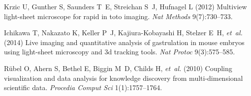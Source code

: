 \documentclass{pnastwo}
\begin{document}
\begin{article}
\begin{thebibliography}{10}
Krzic U, Gunther S, Saunders T~E, Streichan S~J, Hufnagel L (2012) Multiview
  light-sheet microscope for rapid in toto imaging. \textit{Nat Methods}
  9(7):730--733.

Ichikawa T, Nakazato K, Keller P~J, Kajiura-Kobayashi H, Stelzer E~H,
  \textit{et~al.} (2014) Live imaging and quantitative analysis of gastrulation
  in mouse embryos using light-sheet microscopy and 3d tracking tools.
  \textit{Nat Protoc} 9(3):575--585.

R{\"u}bel O, Ahern S, Bethel E, Biggin M~D, Childs H, \textit{et~al.} (2010)
  Coupling visualization and data analysis for knowledge discovery from
  multi-dimensional scientific data. \textit{Procedia Comput Sci}
  1(1):1757--1764.

\end{thebibliography}



\end{article}
\end{document}

